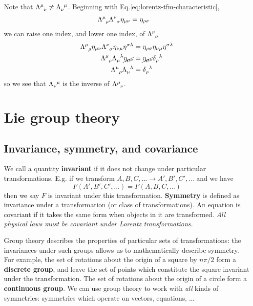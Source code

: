 \documentclass[11pt]{article}
\numberwithin{equation}{section}
\begin{document}
Note that $\tensor{\Lambda}{^\mu_\nu} \neq \tensor{\Lambda}{_\nu^\mu}$. Beginning with Eq.\eqref{eq:lorentz-tfm-characteristic},
\begin{align*}
\tensor{\Lambda}{^\mu_\rho} \tensor{\Lambda}{^\nu_\sigma} \eta_{\mu \nu} &= \eta_{\rho \sigma}
\end{align*}
we can raise one index, and lower one index, of $\tensor{\Lambda}{^\nu_\sigma}$
\begin{align}
\tensor{\Lambda}{^\mu_\rho} \eta_{\mu \nu} \tensor{\Lambda}{^\nu_\sigma} \eta_{\nu \mu} \eta^{\sigma \lambda}  &= \eta_{\rho \sigma} \eta_{\nu \mu} \eta^{\sigma \lambda} \nonumber \\
\tensor{\Lambda}{^\mu_\rho} \tensor{\Lambda}{_\mu^\lambda} \cancel{\eta_{\mu \nu}} &=  \cancel{\eta_{\mu \nu}} \tensor{\delta}{_\rho^\lambda} \nonumber \\
\tensor{\Lambda}{^\mu_\rho} \tensor{\Lambda}{_\mu^\lambda} &= \tensor{\delta}{_\rho^\lambda}
\end{align}
so we see that $\tensor{\Lambda}{_\nu^\mu}$ is the inverse of $\tensor{\Lambda}{^\mu_\nu}$.


\section{Lie group theory}
\subsection{Invariance, symmetry, and covariance}
We call a quantity \textbf{invariant} if it does not change under particular transformations. E.g. if we transform $A,B,C,... \rightarrow A',B',C',...$ and we have
\begin{equation}
F(A',B',C',...) = F(A,B,C,...)
\end{equation}
then we say $F$ is invariant under this transformation. \textbf{Symmetry} is defined as invariance under a transformation (or class of transformations). An equation is covariant if it takes the same form when objects in it are transformed. \textit{All physical laws must be covariant under Lorentz transformations.} 

Group theory describes the properties of particular sets of transformations: the invariances under such groups allows us to mathematically describe symmetry. For example, the set of rotations about the origin of a square by $n\pi/2$ form a \textbf{discrete group}, and leave the set of points which constitute the square invariant under the transformation. The set of rotations about the origin of a circle form a \textbf{continuous group}. We can use group theory to work with \textit{all} kinds of symmetries: symmetries which operate on vectors, equations, ...
\end{document}
